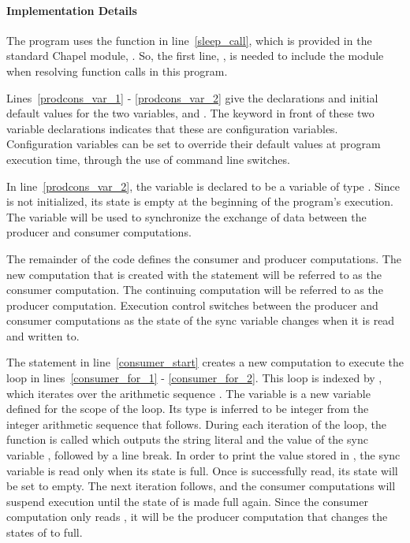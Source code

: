 \paragraph{Implementation Details}
The program uses the  function in line~\ref{sleep_call}, which is 
provided in the
standard Chapel module, .  So, the first line, , 
is needed to include the  module when resolving 
function calls in this program.  

Lines~\ref{prodcons_var_1} - \ref{prodcons_var_2} give the declarations 
and initial default values
for the two variables,  and .
The  keyword in front of these two variable declarations 
indicates that these are configuration variables.  Configuration variables 
can be set to override their default values at program execution time, through the 
use of command line switches.  

In line~\ref{prodcons_var_2}, the variable  is 
declared to be a  variable 
of type .  Since 
is not initialized, its state is empty at the beginning of the program's execution.
The variable  will be used
to synchronize the exchange of data between the producer and consumer computations.

The remainder of the code defines the consumer and producer computations.
The new computation that is created with the  statement will
be referred to as the consumer computation.  The continuing computation
will be referred to as the
producer computation.  Execution control switches between the
producer and consumer computations as the state of the sync variable 
changes when it is read and written to.

The  statement in line~\ref{consumer_start} creates a 
new computation to execute the 
loop in lines~\ref{consumer_for_1} - \ref{consumer_for_2}.  This loop is 
indexed by , which iterates over
the arithmetic sequence .  The variable  is a new
variable defined for the scope of the loop.  Its type is inferred to be integer from
the integer arithmetic sequence that follows.  During each iteration of the 
loop, the  function is called which outputs the string
literal  and the value of the sync variable , 
followed by a line break.  In order to print the value stored in , the
sync variable is read only when its state is full.  Once  is successfully
read, its state will be set to empty.  The next iteration follows, and the 
consumer computations will suspend execution until the state of  is 
made full again.  Since the consumer computation only reads , it will be 
the producer computation that changes the states of  to full.

